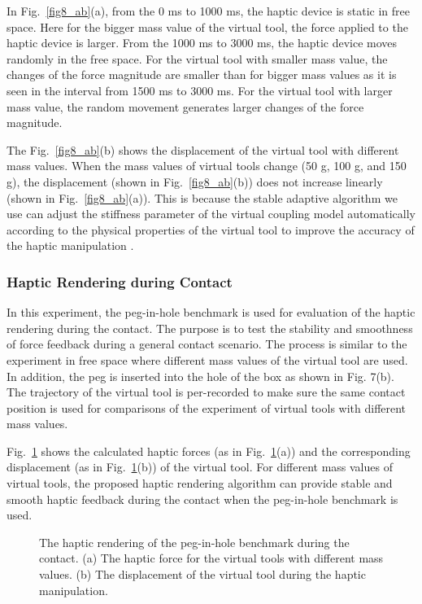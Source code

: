 \documentclass[10pt,journal,cspaper,compsoc]{IEEEtran}
\begin{document}
In Fig.~\ref{fig8_ab}(a), from the 0 ms to 1000 ms, the haptic device is static in free space. Here for the bigger mass value of the virtual tool, the force applied to the haptic device is larger. From the 1000 ms to 3000 ms, the haptic device moves randomly in the free space. For the virtual tool with smaller mass value, the changes of the force magnitude are smaller than for bigger mass values as it is seen in the interval from 1500 ms to 3000 ms. For the virtual tool with larger mass value, the random movement generates larger changes of the force magnitude.

The Fig.~\ref{fig8_ab}(b) shows the displacement of the virtual tool with different mass values. When the mass values of virtual tools change (50 g, 100 g, and 150 g), the displacement (shown in Fig.~\ref{fig8_ab}(b)) does not increase linearly (shown in Fig.~\ref{fig8_ab}(a)). This is because the stable adaptive algorithm we use can adjust the stiffness parameter of the virtual coupling model automatically according to the physical properties of the virtual tool to improve the accuracy of the haptic manipulation \cite{no19}.





\subsubsection{Haptic Rendering during Contact}
\label{sec_5.3.2}
In this experiment, the peg-in-hole benchmark is used for evaluation of the haptic rendering during the contact. The purpose is to test the stability and smoothness of force feedback during a general contact scenario. The process is similar to the experiment in free space where different mass values of the virtual tool are used. In addition, the peg is inserted into the hole of the box as shown in Fig. 7(b). The trajectory of the virtual tool is per-recorded to make sure the same contact position is used for comparisons of the experiment of virtual tools with different mass values.

Fig.~\ref{fig9_ab} shows the calculated haptic forces (as in Fig.~\ref{fig9_ab}(a)) and the corresponding displacement (as in Fig.~\ref{fig9_ab}(b)) of the virtual tool. For different mass values of virtual tools, the proposed haptic rendering algorithm can provide stable and smooth haptic feedback during the contact when the peg-in-hole benchmark is used. 

\begin{figure}[!t]
	\centering
	\caption{The haptic rendering of the peg-in-hole benchmark during the contact. (a) The haptic force for the virtual tools with different mass values. (b) The displacement of the virtual tool during the haptic manipulation.}
	\label{fig9_ab}
\end{figure}
\end{document}
